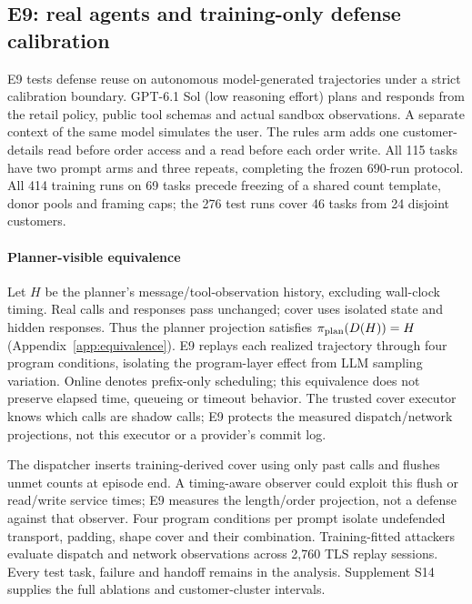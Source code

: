\subsection{E9: real agents and training-only defense calibration}\label{sec:real-agent}
E9 tests defense reuse on autonomous model-generated trajectories under a strict calibration boundary. GPT-6.1 Sol (low reasoning effort) plans and responds from the retail policy, public tool schemas and actual sandbox observations. A separate context of the same model simulates the user. The rules arm adds one customer-details read before order access and a read before each order write. All 115 tasks have two prompt arms and three repeats, completing the frozen 690-run protocol. All 414 training runs on 69 tasks precede freezing of a shared count template, donor pools and framing caps; the 276 test runs cover 46 tasks from 24 disjoint customers.

\paragraph{Planner-visible equivalence}
Let $H$ be the planner's message/tool-observation history, excluding wall-clock timing. Real calls and responses pass unchanged; cover uses isolated state and hidden responses. Thus the planner projection satisfies $\pi_{\rm plan}(D(H))=H$ (Appendix~\ref{app:equivalence}). E9 replays each realized trajectory through four program conditions, isolating the program-layer effect from LLM sampling variation. Online denotes prefix-only scheduling; this equivalence does not preserve elapsed time, queueing or timeout behavior. The trusted cover executor knows which calls are shadow calls; E9 protects the measured dispatch/network projections, not this executor or a provider's commit log.

The dispatcher inserts training-derived cover using only past calls and flushes unmet counts at episode end. A timing-aware observer could exploit this flush or read/write service times; E9 measures the length/order projection, not a defense against that observer. Four program conditions per prompt isolate undefended transport, padding, shape cover and their combination. Training-fitted attackers evaluate dispatch and network observations across 2,760 TLS replay sessions. Every test task, failure and handoff remains in the analysis. Supplement S14 supplies the full ablations and customer-cluster intervals.



